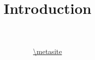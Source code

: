 \documentclass[14pt]{beamer}
\title[Introduction]{Introduction}
\date{}
\author[VI Tutorial @ \metahost]{ \metaauthor \\
~ \\
\url{\metasite}
}
\institute[]{\metaack}
\begin{document}
\frame{\titlepage}


\end{document}
